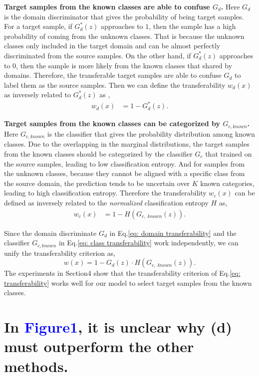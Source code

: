 \textbf{Target samples from the known classes are able to confuse $G_d$.} 
Here $G_d$ is the domain discriminator that gives the probability of being target samples.
For a target sample, if $G_d^*(z)$ approaches to $1$, then the sample has a high probability of coming from the unknown classes.
That is because the unknown classes only included in the target domain and can be almost perfectly discriminated from the source samples. 
On the other hand, if $G_d^*(z)$ approaches to $0$, then the sample is more likely from the known classes that shared by domains. 
Therefore, the transferable target samples are able to confuse $G_d$ to label them as the source samples.
Then we can define the transferability $w_d(x)$ as inversely related to $G_d^*(z)$ as ,
\begin{align}
    w_d(x) &= 1-G_d^*(z). \label{eq: domain transferability} 
\end{align}

\textbf{Target samples from the known classes can be categorized by $G_{c, known}$.}
Here $G_{c, known}$ is the classifier that gives the probability distribution among known classes.
Due to the overlapping in the marginal distributions, the target samples from the known classes should be categorized by the classifier $G_c$ that trained on the source samples, leading to low classification entropy.
And for samples from the unknown classes, because they cannot be aligned with a specific class from the source domain, the prediction tends to be uncertain over $K$ known categories, leading to high classification entropy.
Therefore the transferability $w_c(x)$ can be defined as inversely related to the \textit{normalized} classification entropy $H$ as,
\begin{align}
    w_c(x) &=1-H(G_{c,\; known}(z)). \label{eq: class transferability}
\end{align}

Since the domain discriminate $G_d$ in Eq.\ref{eq: domain transferability} and the classifier $G_{c, known}$ in Eq.\ref{eq: class transferability} work independently, we can unify the transferability criterion as,
\begin{equation}
    \label{eq: transferability}
    w(x)=1-G_d(z)\cdot H(G_{c,\; known}(z)).
\end{equation} 
The experiments in Section4 show that the transferability criterion of Eq.\ref{eq: transferability} works well for our model to select target samples from the known classes.


\section{
    In \textcolor{blue}{Figure1}, it is unclear why (d) must outperform the other methods. 
}

